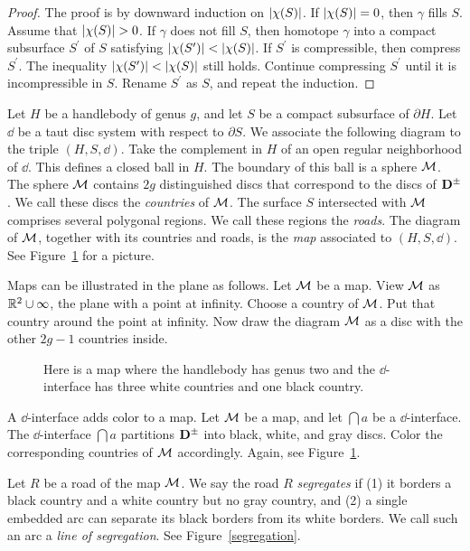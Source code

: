 \begin{proof}
The proof is by downward induction on $| \chi (S) |$.  If $| \chi (S) |=0$, then $\gamma$ fills $S$.  Assume that $\ec{S}>0$.  If $\gamma$ does not fill $S$,
then homotope $\gamma$ into a compact subsurface $S^\prime$ of $S$ satisfying $\ec{S^\prime}<\ec{S}$.  If $S^\prime$ is compressible, then compress $S^\prime$.  The inequality $\ec{S^\prime}<\ec{S}$ still holds.  Continue compressing $S^\prime$ until it  is incompressible in $S$.  Rename $S^\prime$ as $S$, and repeat the induction.
\end{proof}

Let $H$ be a handlebody of genus $g$, and let $S$ be a compact subsurface of  $\partial H$.  Let $\dd$ be a taut disc system with respect to $\partial S$.  We associate the following diagram to the triple $(H,S,\dd)$.  Take the complement in $H$ of an open regular neighborhood of $\dd$.  This defines a closed ball in $H$.  The boundary of this ball is a sphere $\mathcal{M}$.  The sphere $\mathcal{M}$ contains $2g$ distinguished discs that correspond to the discs of $\mathbf{D}^\pm$.  We call these discs the \emph{countries} of $\mathcal{M}$.  The surface $S$ intersected with $\mathcal{M}$ comprises several polygonal regions.  We call these regions the \emph{roads}.  The diagram of $\mathcal{M}$, together with its countries and roads, is the \emph{map} associated to $(H,S,\dd)$.  See Figure~\ref{map} for a picture.

Maps can be illustrated in the plane as follows.  Let $\mathcal{M}$ be a map.  View $\mathcal{M}$ as ${\mathbb R}^2\cup\infty$, the plane with a point at infinity.  Choose a country of $\mathcal{M}$.  Put that country around the point at infinity.  Now draw the diagram $\mathcal{M}$ as a disc with the other $2g-1$ countries inside.  
\begin{figure}
\caption{Here is a map where the handlebody has genus two and the $\dd$-interface has three white countries and one black country.
}
\label{map}
\end{figure}

A $\dd$-interface adds color to a map.  Let $\mathcal{M}$ be a map, and let $\dint{a}$ be a $\dd$-interface.  The $\dd$-interface  $\dint{a}$ partitions $\mathbf{D}^\pm$ into black, white, and gray discs.  Color the corresponding countries of $\mathcal{M}$ accordingly.  Again, see Figure~\ref{map}.

Let $R$ be a road of the map $\mathcal{M}$.  We say the road $R$ \emph{segregates} 
if (1) it borders a black country and a white country but no gray country, and (2) a single embedded arc can separate its black borders from its white borders.  We call such an arc a \emph{line of segregation}.  See Figure~\ref{segregation}.

